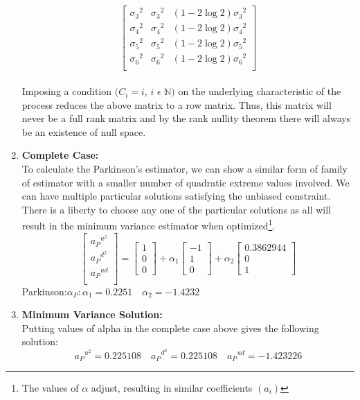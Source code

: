 \documentclass[12pt]{article}   	%
\begin{document}
\begin{enumerate}
$$\begin{bmatrix}
\sigma_3{^2} &\sigma_3{^2} & (1-2\log 2)\sigma_3{^2} \\
\sigma_4{^2} &\sigma_4{^2} & (1-2\log 2)\sigma_4{^2} \\
\sigma_5{^2} &\sigma_5{^2} & (1-2\log 2)\sigma_5{^2} \\
\sigma_6{^2} &\sigma_6{^2} & (1-2\log 2)\sigma_6{^2} \\
\end{bmatrix}$$\\
Imposing a condition $(C_i=i$, $i$ $\epsilon $ $\mathbb N)$ on the underlying characteristic of the process reduces the  above matrix to a row matrix. Thus, this matrix will never be a full rank matrix and by the rank nullity theorem there will always be an existence of null space.  
\item \textbf{Complete Case:}\\
To calculate the Parkinson's estimator, we can show a similar form of family of estimator with a smaller number of quadratic extreme values involved. We can have multiple particular solutions satisfying the unbiased constraint. There is a liberty to choose any one of the particular solutions as all will result in the minimum variance estimator when optimized\footnote{The values of $\alpha$ adjust, resulting in similar coefficients $(a_i)$}.
$$\begin{bmatrix}
{a_{P}}^{u^2}\\
{a_{P}}^{d^2}\\
{a_{P}}^{ud}\\
\end{bmatrix}=
\begin{bmatrix}
1\\
0\\
0\end{bmatrix}+\alpha_1
\begin{bmatrix}
-1\\
1\\
0\end{bmatrix}+\alpha_2
\begin{bmatrix}
0.3862944\\
0\\
1\end{bmatrix}
$$
Parkinson:\quad $\alpha_P: \alpha_1=0.2251\quad \alpha_2=-1.4232$ 

\item \textbf{Minimum Variance Solution:}\\
Putting values of alpha in the complete case above gives the following solution:\\
$${a_{P}}^{u^2}=0.225108\quad{a_{P}}^{d^2}=0.225108\quad{a_{P}}^{ud}=-1.423226$$


\end{enumerate}
\end{document}
